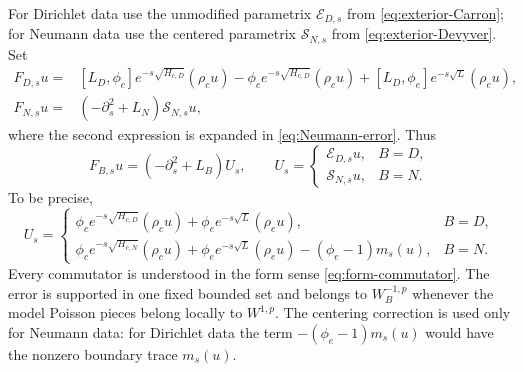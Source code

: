 \documentclass[12pt]{amsart}
\theoremstyle{remark}
\begin{document}
For Dirichlet data use the unmodified parametrix
\(\mathcal E_{D,s}\) from \eqref{eq:exterior-Carron}; for Neumann data use the centered parametrix \(\mathcal S_{N,s}\) from
\eqref{eq:exterior-Devyver}.  Set
\begin{align*}
 F_{D,s}u={}&[L_D,\phi_c]e^{-s\sqrt{H_{c,D}}}(\rho_cu)
 -\phi_ce^{-s\sqrt{H_{c,D}}}(\rho_cu)
 +[L_D,\phi_e]e^{-s\sqrt L}(\rho_eu),\\
 F_{N,s}u={}&(-\partial_s^2+L_N)\mathcal S_{N,s}u,
\end{align*}
where the second expression is expanded in \eqref{eq:Neumann-error}.  Thus
\begin{equation}\label{eq:parametrix-error-casewise}
 F_{B,s}u=(-\partial_s^2+L_B)U_s,\qquad
 U_s=
 \begin{cases}
  \mathcal E_{D,s}u,&B=D,\\
  \mathcal S_{N,s}u,&B=N.
 \end{cases}
\end{equation}
To be precise,
\[
 U_s=
 \begin{cases}
  \phi_ce^{-s\sqrt{H_{c,D}}}(\rho_cu)
  +\phi_ee^{-s\sqrt L}(\rho_eu),&B=D,\\[1mm]
  \phi_ce^{-s\sqrt{H_{c,N}}}(\rho_cu)
  +\phi_ee^{-s\sqrt L}(\rho_eu)
  -(\phi_e-1)m_s(u),&B=N.
 \end{cases}
\]
Every commutator is understood in the form sense
\eqref{eq:form-commutator}.  The error is supported in one fixed bounded
set and belongs to \(W_B^{-1,p}\) whenever the model Poisson
pieces belong locally to \(W^{1,p}\).  The centering correction is used only for
Neumann data: for Dirichlet data the term
\(-(\phi_e-1)m_s(u)\) would have the nonzero boundary trace \(m_s(u)\).
\end{document}
